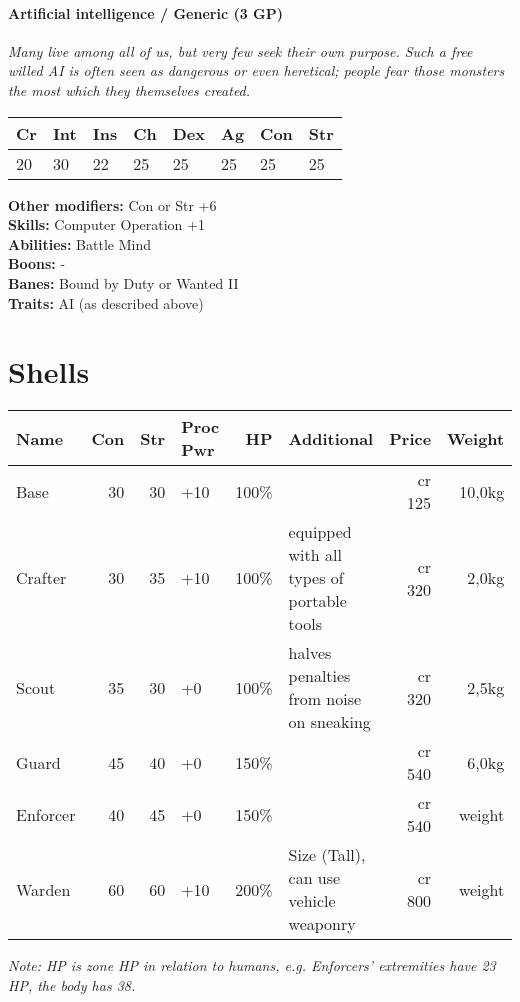 \documentclass[12pt,a4paper]{book}
\begin{document}
	\paragraph*{Artificial intelligence / Generic (3 GP)}
	\textit{Many live among all of us, but very few seek their own purpose. Such a free willed AI is often seen as dangerous or even heretical; people fear those monsters the most which they themselves created.}\par
	\begin{tabular}{|l|l|l|l|l|l|l|l|}
		\hline
		Cr & Int & Ins & Ch & Dex & Ag & Con & Str \\ \hline
		20 & 30 & 22 & 25 & 25 & 25 & 25 & 25 \\ \hline
	\end{tabular}\par
	\noindent\textbf{Other modifiers:} Con or Str +6\\
	\textbf{Skills:} Computer Operation +1\\
	\textbf{Abilities:} Battle Mind\\
	\textbf{Boons:} -\\
	\textbf{Banes:} Bound by Duty or Wanted II\\
	\textbf{Traits:} AI (as described above)
	
	\section{Shells}
	\begin{tabularx}{\textwidth}{|l|r|r|l|r|X|r|r|}
		\hline
		Name & Con & Str & Proc Pwr & HP & Additional & Price & Weight \\ \hline
		Base & 30 & 30 & +10 & 100\% & & cr 125 & 10,0kg \\ \hline
		Crafter & 30 & 35 & +10 & 100\% & equipped with all types of portable tools & cr 320 & 2,0kg \\ \hline
		Scout & 35 & 30 & +0 & 100\% & halves penalties from noise on sneaking & cr 320 & 2,5kg \\ \hline
		Guard & 45 & 40 & +0 & 150\% & & cr 540 & 6,0kg \\ \hline
		Enforcer & 40 & 45 & +0 & 150\% & & cr 540 & weight \\ \hline
		Warden & 60 & 60 & +10 & 200\% & Size (Tall), can use vehicle weaponry & cr 800 & weight \\ \hline
	\end{tabularx}
	\textit{Note: HP is zone HP in relation to humans, e.g. Enforcers' extremities have 23 HP, the body has 38.}
\end{document}
